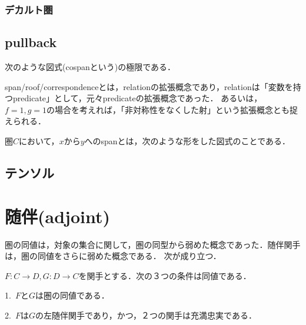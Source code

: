 \documentclass[uplatex, 12pt, dvipdfmx]{jsreport}
\begin{document}
\subsection{デカルト圏}

\section{pullback}

\begin{definition}[pullbackの普遍性]\rm{}
    次のような図式(cospanという)の極限である．
    \begin{center}\end{center}
\end{definition}

span/roof/correspondenceとは，relationの拡張概念であり，relationは「変数を持つpredicate」として，元々predicateの拡張概念であった．
あるいは，$f=1,g=1$の場合を考えれば，「非対称性をなくした射」という拡張概念とも捉えられる．
\begin{definition}\rm{}
    圏$C$において，$x$から$y$へのspanとは，次のような形をした図式のことである．
    \begin{center}\end{center}
\end{definition}

\section{テンソル}

\chapter{随伴(adjoint)}
圏の同値は，対象の集合に関して，圏の同型から弱めた概念であった．随伴関手は，圏の同値をさらに弱めた概念である．
次が成り立つ．
\begin{proposition}
    $F:C\to D, G:D\to C$を関手とする．次の３つの条件は同値である．\rm{}

    1.\, $F$と$G$は圏の同値である．

    2.\, $F$は$G$の左随伴関手であり，かつ，２つの関手は充満忠実である．
\end{proposition}
\end{document}
